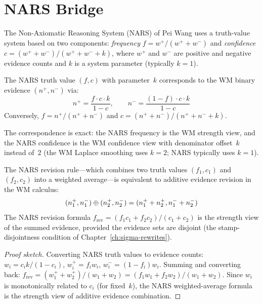 \section{NARS Bridge}
\label{sec:bridge-nars}

The Non-Axiomatic Reasoning System (NARS) of Pei Wang uses a
truth-value system based on two components: \emph{frequency}
$f = w^+ / (w^+ + w^-)$ and \emph{confidence}
$c = (w^+ + w^-) / (w^+ + w^- + k)$, where $w^+$ and $w^-$ are
positive and negative evidence counts and $k$ is a system parameter
(typically $k = 1$).

\begin{definition}
\label{def:nars-bridge}
The NARS truth value $(f, c)$ with parameter~$k$ corresponds to the
WM binary evidence $(n^+, n^-)$ via:
\[
  n^+ = \frac{f \cdot c \cdot k}{1 - c}, \qquad
  n^- = \frac{(1-f) \cdot c \cdot k}{1 - c}
\]
Conversely, $f = n^+ / (n^+ + n^-)$ and
$c = (n^+ + n^-) / (n^+ + n^- + k)$.
\end{definition}

\noindent
The correspondence is exact: the NARS frequency is the WM strength
view, and the NARS confidence is the WM confidence view with
denominator offset~$k$ instead of~$2$ (the WM Laplace smoothing
uses $k = 2$; NARS typically uses $k = 1$).

\begin{theorem}
\label{thm:nars-revision}
The NARS revision rule---which combines two truth values
$(f_1, c_1)$ and $(f_2, c_2)$ into a weighted average---is
equivalent to additive evidence revision in the WM calculus:
\[
  (n_1^+, n_1^-) \oplus (n_2^+, n_2^-) = (n_1^+ + n_2^+, n_1^- + n_2^-)
\]
The NARS revision formula
$f_{\mathrm{rev}} = (f_1 c_1 + f_2 c_2) / (c_1 + c_2)$
is the strength view of the summed evidence, provided the evidence
sets are disjoint (the stamp-disjointness condition of
Chapter~\ref{ch:sigma-rewrites}).
\end{theorem}

\begin{proof}[Proof sketch]
Converting NARS truth values to evidence counts:
$w_i = c_i k / (1 - c_i)$, $w_i^+ = f_i w_i$, $w_i^- = (1-f_i) w_i$.
Summing and converting back:
$f_{\mathrm{rev}} = (w_1^+ + w_2^+) / (w_1 + w_2)
= (f_1 w_1 + f_2 w_2) / (w_1 + w_2)$.
Since $w_i$ is monotonically related to $c_i$ (for fixed~$k$), the
NARS weighted-average formula is the strength view of additive
evidence combination.
\end{proof}

